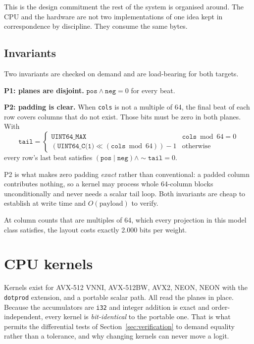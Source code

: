 \documentclass[10pt,twocolumn]{article}
\begin{document}
This is the design commitment the rest of the system is organised around. The
CPU and the hardware are not two implementations of one idea kept in
correspondence by discipline. They consume the same bytes.

\subsection{Invariants}

Two invariants are checked on demand and are load-bearing for both targets.

\textbf{P1: planes are disjoint.} $\texttt{pos} \wedge \texttt{neg} = 0$ for
every beat.

\textbf{P2: padding is clear.} When \texttt{cols} is not a multiple of 64, the
final beat of each row covers columns that do not exist. Those bits must be zero
in both planes. With
\begin{equation*}
\texttt{tail} =
\begin{cases}
\texttt{UINT64\_MAX} & \texttt{cols} \bmod 64 = 0\\
(\texttt{UINT64\_C(1)} \ll (\texttt{cols} \bmod 64)) - 1 & \text{otherwise}
\end{cases}
\end{equation*}
every row's last beat satisfies
$(\texttt{pos} \mid \texttt{neg}) \wedge \sim\!\texttt{tail} = 0$.

P2 is what makes zero padding \emph{exact} rather than conventional: a padded
column contributes nothing, so a kernel may process whole 64-column blocks
unconditionally and never needs a scalar tail loop. Both invariants are cheap to
establish at write time and $O(\text{payload})$ to verify.

At column counts that are multiples of 64, which every projection in this model
class satisfies, the layout costs exactly 2.000 bits per weight.

\section{CPU kernels}

Kernels exist for AVX-512 VNNI, AVX-512BW, AVX2, NEON, NEON with the
\texttt{dotprod} extension, and a portable scalar path. All read the planes in
place. Because the accumulators are \texttt{i32} and integer addition is exact
and order-independent, every kernel is \emph{bit-identical} to the portable one.
That is what permits the differential tests of
Section~\ref{sec:verification} to demand equality rather than a tolerance, and
why changing kernels can never move a logit.
\end{document}
